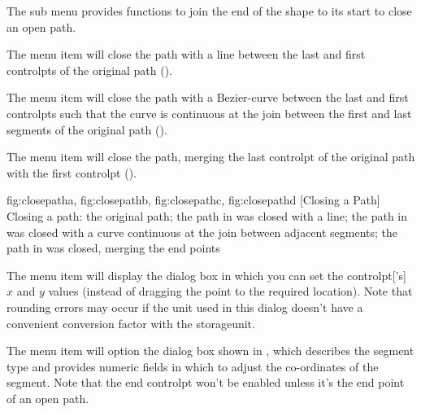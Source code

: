 
The  sub menu provides functions to join
the end of the \gls{shape} to its start to close an open path.


The  menu item will
close the path with a line between the last and first
\glspl*{controlpt} of the original path ().


The  menu item will
close the path with a \gls{Bezier-curve} between the last and first
\glspl*{controlpt} such that the curve is continuous at the join
between the first and last segments of the original path
().


The  menu item will
close the path, merging the last \gls*{controlpt} of the original
path with the first \gls*{controlpt} ().

{%
  {fig:closepatha}{}{},
  {fig:closepathb}{}{},
  {fig:closepathc}{}{},
  {fig:closepathd}{}{}
}
[Closing a Path]
{Closing a path:  the original path;
the path in  was closed with a line;
 the path in  was closed with a
curve continuous at the join between adjacent segments;
 the path in  was closed, merging
the end points}


The  menu item will display the
 dialog box in which you can set the
\gls{controlpt}['s] $x$ and $y$ values (instead of dragging the
point to the required location).  Note that rounding errors may
occur if the unit used in this dialog doesn't have a convenient
conversion factor with the \gls{storageunit}.


The  menu item will option the 
 dialog box shown in
, which describes the segment type and
provides numeric fields in which to adjust the co-ordinates of the
segment. Note that the end \gls{controlpt} won't be enabled unless 
it's the end point of an open path.

